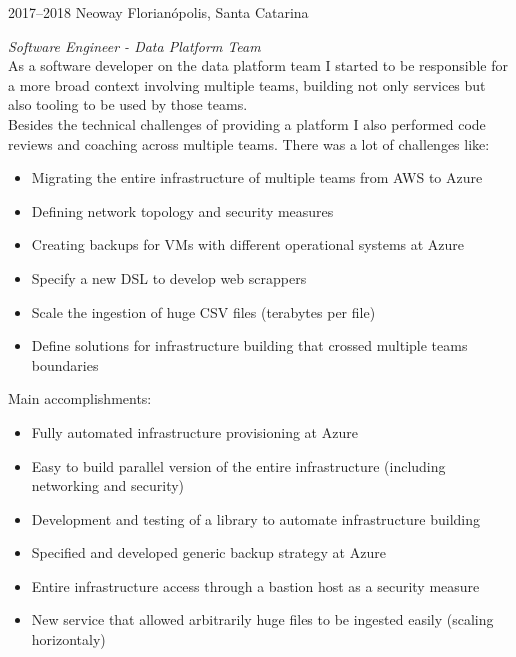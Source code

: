 \documentclass[]{friggeri-cv} %
\begin{document}
\begin{entrylist}
\entry
{2017--2018}
{Neoway}
{Florianópolis, Santa Catarina}
{\emph{Software Engineer - Data Platform Team} \\

    As a software developer on the data platform team I started to be
    responsible for a more broad context involving multiple teams, building not
    only services but also tooling to be used by those teams. \\
    Besides the technical challenges of providing a platform I also performed
    code reviews and coaching across multiple teams.
    There was a lot of challenges like:\\

\begin{itemize}
    \item Migrating the entire infrastructure of multiple teams from AWS to Azure
    \item Defining network topology and security measures
    \item Creating backups for VMs with different operational systems at Azure
    \item Specify a new DSL to develop web scrappers
    \item Scale the ingestion of huge CSV files (terabytes per file)
    \item Define solutions for infrastructure building that crossed multiple teams boundaries
\end{itemize}

Main accomplishments:

\begin{itemize}
    \item Fully automated infrastructure provisioning at Azure
    \item Easy to build parallel version of the entire infrastructure (including networking and security)
    \item Development and testing of a library to automate infrastructure building
    \item Specified and developed generic backup strategy at Azure
    \item Entire infrastructure access through a bastion host as a security measure
    \item New service that allowed arbitrarily huge files to be ingested easily (scaling horizontaly)
\end{itemize}
}
\end{entrylist}
\end{document}
